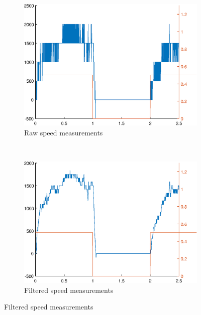 \documentclass{article}
\begin{document}
\begin{figure}[!htb]
    \centering
    \begin{subfigure}[b]{0.4\textwidth}
        \includegraphics[width=\textwidth]{../Experiments/raw_speed.eps}
        \caption{Raw speed measurements}
        \label{fig:raw1}
    \end{subfigure}
    ~ %
    \begin{subfigure}[b]{0.4\textwidth}
        \includegraphics[width=\textwidth]{../Experiments/filtered_speed.eps}
        \caption{Filtered speed measurements}
        \label{fig:filter1}
    \end{subfigure}
\end{figure}
\end{document}
